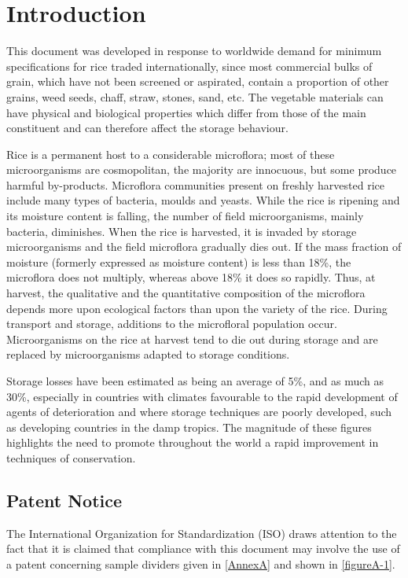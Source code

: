 \section*{Introduction}

This document was developed in response to worldwide demand for minimum specifications for rice traded internationally, since most commercial bulks of grain, which have not been screened or aspirated, contain a proportion of other grains, weed seeds, chaff, straw, stones, sand, etc. The vegetable materials can have physical and biological properties which differ from those of the main constituent and can therefore affect the storage behaviour.

Rice is a permanent host to a considerable microflora; most of these microorganisms are cosmopolitan, the majority are innocuous, but some produce harmful by-products. Microflora communities present on freshly harvested rice include many types of bacteria, moulds and yeasts. While the rice is ripening and its moisture content is falling, the number of field microorganisms, mainly bacteria, diminishes. When the rice is harvested, it is invaded by storage microorganisms and the field microflora gradually dies out. If the mass fraction of moisture (formerly expressed as moisture content) is less than 18\%, the microflora does not multiply, whereas above 18\% it does so rapidly. Thus, at harvest, the qualitative and the quantitative composition of the microflora depends more upon ecological factors than upon the variety of the rice. During transport and storage, additions to the microfloral population occur. Microorganisms on the rice at harvest tend to die out during storage and are replaced by microorganisms adapted to storage conditions.

Storage losses have been estimated as being an average of 5\%, and as much as 30\%, especially in countries with climates favourable to the rapid development of agents of deterioration and where storage techniques are poorly developed, such as developing countries in the damp tropics. The magnitude of these figures highlights the need to promote throughout the world a rapid improvement in techniques of conservation.


\subsection*{Patent Notice}

The International Organization for Standardization (ISO) draws attention to the fact that it is claimed that compliance with this document may involve the use of a patent concerning sample dividers given in \ref{AnnexA} and shown in \ref{figureA-1}.

